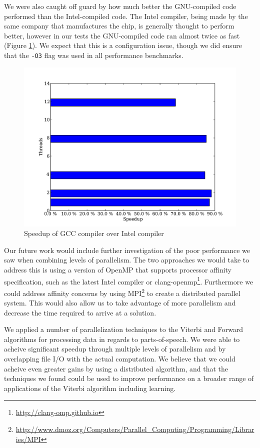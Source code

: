 \documentclass[11pt,onecolumn]{article}
\begin{document}
We were also caught off guard by how much better the GNU-compiled code performed than the Intel-compiled code. The Intel compiler, being made by the same company that manufactures the chip, is generally thought to perform better, however in our tests the GNU-compiled code ran almost twice as fast (Figure \ref{fig:gccvsintel}). We expect that this is a configuration issue, though we did ensure that the \texttt{-O3} flag was used in all performance benchmarks.

\begin{figure}[h!]
\centering
\includegraphics[width=.75\linewidth]{figures/comparison_of_intel_and_gnu_comiler_performance}
\caption{Speedup of GCC compiler over Intel compiler}
\label{fig:gccvsintel}
\end{figure}


Our future work would include further investigation of the poor performance we saw when combining levels of parallelism. The two approaches we would take to address this is using a version of OpenMP that supports processor affinity specification, such as the latest Intel compiler or clang-openmp\footnote{\url{http://clang-omp.github.io}}. Furthermore we could address affinity concerns by using MPI\footnote{\url{http://www.dmoz.org/Computers/Parallel_Computing/Programming/Libraries/MPI}} to create a distributed parallel system. This would also allow us to take advantage of more parallelism and decrease the time required to arrive at a solution.


We applied a number of parallelization techniques to the Viterbi and Forward algorithms for processing data in regards to parts-of-speech. We were able to acheive significant speedup through multiple levels of parallelism and by overlapping file I/O with the actual computation. We believe that we could acheive even greater gains by using a distributed algorithm, and that the techniques we found could be used to improve performance on a broader range of applications of the Viterbi algorithm including learning.
\end{document}
